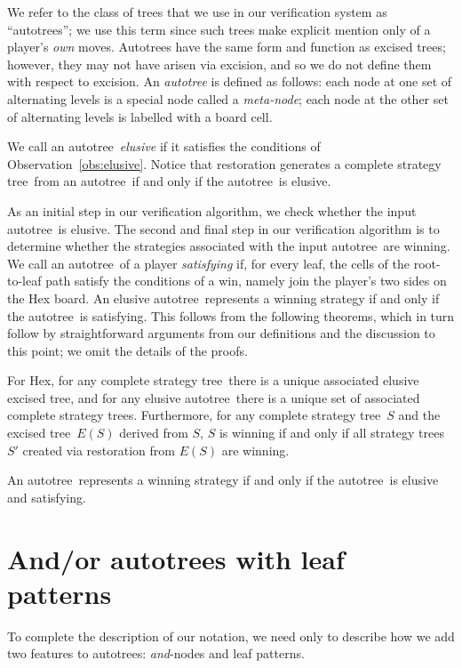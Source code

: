 \documentclass{llncs}
\def\at{autotree}
\def\stt{strategy tree}
\def\exct{excised tree}
\def\myAND{\mbox{\it and}}
\def\andnode{\myAND-node}
\begin{document}
We refer to the class of trees that we use
in our verification system as ``\at s'';
we use this term since such trees
make explicit mention only of a player's {\it own} moves.
Autotrees have the same form and function
as \exct s; however, they may not have arisen via excision, 
and so we do not define them with respect to excision.
An {\it \at} is defined as follows:
each node at one set of alternating levels is
a special node called a {\it meta-node};
each node at the other set of alternating levels 
is labelled with a board cell.

We call an \at\ {\it elusive}
if it satisfies the conditions of Observation~\ref{obs:elusive}.
Notice that restoration generates a complete \stt\ from
an \at\ if and only if the \at\ is elusive.

As an initial step in our verification algorithm,
we check whether the input \at\ is elusive.
The second and final step in our verification algorithm
is to determine whether the strategies
associated with the input \at\ are winning.
We call an \at\ of a player
{\it satisfying} if, for every leaf,
the cells of the root-to-leaf path 
satisfy the conditions of a win,
namely join the player's two sides on the Hex board.
An elusive \at\ represents a winning strategy
if and only if the \at\ is satisfying.
This follows from the following theorems,
which in turn follow by straightforward arguments from
our definitions and the discussion to this point;
we omit the details of the proofs.

\begin{theorem}
For Hex,
for any complete \stt\ there is a unique associated elusive \exct,
and for any elusive \at\ there is a unique set of associated complete \stt s.
Furthermore, for any complete \stt\ $S$ and the \exct\ $E(S)$ derived from $S$,
$S$ is winning if and only if
all \stt s $S'$ created via restoration from $E(S)$ are winning.
\end{theorem}

\begin{theorem}
An \at\ represents a winning strategy if and only if
the \at\ is elusive and satisfying.
\end{theorem}

\section{And/or \at s with leaf patterns}
To complete the description of our notation,
we need only to describe how we add two features to \at s:
\andnode s and leaf patterns.
\end{document}
